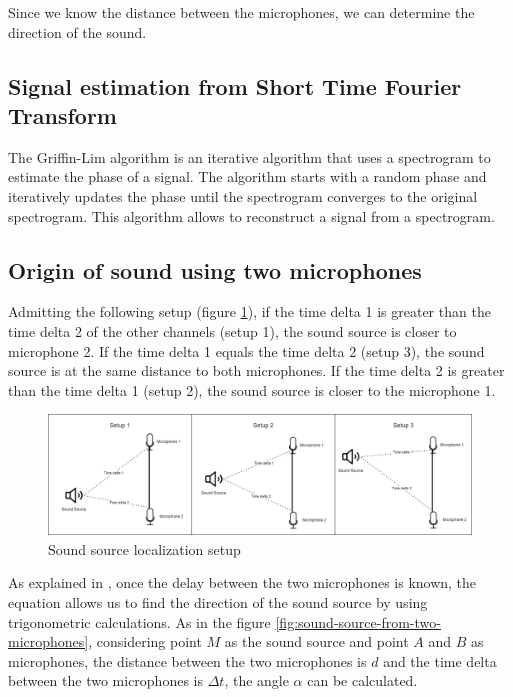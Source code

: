 Since we know the distance between the microphones, we can determine the direction of the sound.

\subsection{Signal estimation from Short Time Fourier Transform}

The Griffin-Lim algorithm\cite{6701851} is an iterative algorithm that uses a spectrogram to estimate the phase of a signal. The algorithm starts with a random phase and iteratively updates the phase until the spectrogram converges to the original spectrogram. This algorithm allows to reconstruct a signal from a spectrogram.

\subsection{Origin of sound using two microphones}

Admitting the following setup (figure \ref*{fig:microphones_setup}), if the time delta 1 is greater than the time delta 2 of the other channels (setup 1), the sound source is closer to microphone 2. If the time delta 1 equals the time delta 2 (setup 3), the sound source is at the same distance to both microphones. If the time delta 2 is greater than the time delta 1 (setup 2), the sound source is closer to the microphone 1. 

\begin{figure}[H]
    \centering
    \includegraphics[width=1\textwidth]{../Images/microphones_setups.png}
    \caption{Sound source localization setup}
    \label{fig:microphones_setup}
\end{figure}

As explained in \cite{Scola2010DirectionOA}, once the delay between the two microphones is known, the equation allows us to find the direction of the sound source by using trigonometric calculations. As in the figure \ref*{fig:sound-source-from-two-microphones}, considering point $M$ as the sound source and point $A$ and $B$ as microphones, the distance between the two microphones is $d$ and the time delta between the two microphones is $\Delta t$, the angle $\alpha$ can be calculated.

